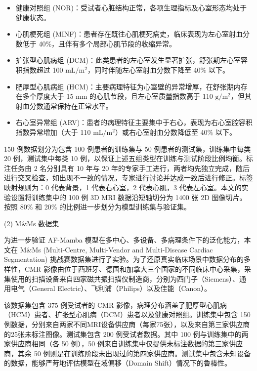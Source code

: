 \documentclass[12pt, a4paper, twoside]{article}
\begin{document}
\begin{itemize}
    \item 健康对照组 (NOR)：受试者心脏结构正常，各项生理指标及心室形态均处于健康状态。
    \item 心肌梗死组 (MINF)：患者存在既往心肌梗死病史，临床表现为左心室射血分数低于 40\%，且伴有多个局部心肌节段的收缩异常。
    \item 扩张型心肌病组 (DCM)：此类患者的左心室发生显著扩张，舒张期左心室容积指数超过 100 $\text{mL}/\text{m}^2$，同时伴随左心室射血分数下降至 40\% 以下。
    \item 肥厚型心肌病组 (HCM)：主要病理特征为心室壁的异常增厚，在舒张期内存在多个厚度大于 15 mm 的心肌节段，且左心室质量指数高于 110 $\text{g}/\text{m}^2$，但其射血分数通常保持在正常水平。
    \item 右心室异常组 (ARV)：患者的病理特征主要集中于右心，表现为右心室腔容积指数异常增加（大于 110 $\text{mL}/\text{m}^2$）或右心室射血分数降低至 40\% 以下。
\end{itemize}

150 例数据划分为包含 100 例患者的训练集与 50 例患者的测试集，训练集中每类 20 例，测试集中每类 10 例，以保证上述五组类型在训练与测试阶段比例均衡。标注任务由 2 名分别具有 10 年与 20 年的专家手工进行，两者均先独立完成，随后进行交叉检查，如出现不一致的情况，专家进行讨论并达成一致后进行修正。标签映射规则为：0 代表背景，1 代表右心室，2 代表心肌，3 代表左心室。本文的实验设置将训练集中的 100 例 3D MRI 数据沿短轴切分为 1400 张 2D 图像切片。按照 80\% 和 20\% 的比例进一步划分为模型训练集与验证集。

(2) M\&Ms 数据集

为进一步验证 AF-Mamba 模型在多中心、多设备、多病理条件下的泛化能力，本文在 M\&Ms (Multi-Centre, Multi-Vendor and Multi-Disease Cardiac Segmentation) 挑战赛数据集进行了实验。为了还原真实临床场景中数据分布的多样性，CMR 影像由位于西班牙、德国和加拿大三个国家的不同临床中心采集，采集使用的扫描设备来自四家磁共振扫描仪制造商，分别为西门子（Siemens）、通用电气（General Electric）、飞利浦（Philips）以及佳能（Canon）。

该数据集包含 375 例受试者的 CMR 影像，病理分布涵盖了肥厚型心肌病（HCM）患者、扩张型心肌病（DCM）患者以及健康对照组。训练集中包含 150 例数据，分别来自两家不同MRI设备供应商（每家75张），以及来自第三家供应商的25张未标注图像。测试集包含 200 例受试者数据。其中 100 例与训练集中的两家供应商相同（各 50 例），50 例来自训练集中仅提供未标注数据的第三家供应商，其余 50 例则是在训练阶段未出现过的第四家供应商。测试集中包含未知设备的数据，能够严苛地评估模型在域偏移（Domain Shift）情况下的鲁棒性。
\end{document}
